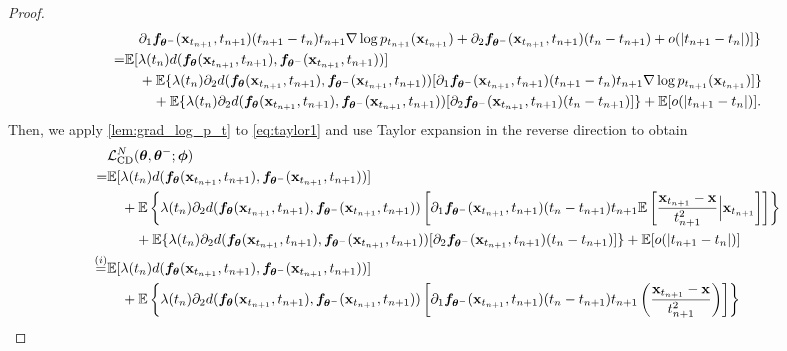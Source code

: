 \begin{appendices}
\begin{proof}
\begin{align}
    &\quad \partial_1{\bm{f}}_{{\bm{\theta}}^{-}}({\mathbf{x}}_{t_{n+1}}, t_{n+1})(t_{n+1} - t_n)t_{n+1} \nabla \log p_{t_{n+1}}({\mathbf{x}}_{t_{n+1}}) + \partial_2 {\bm{f}}_{{\bm{\theta}}^{-}}({\mathbf{x}}_{t_{n+1}}, t_{n+1}) (t_n-t_{n+1}) + o(|t_{n+1} - t_n|)]\}\notag \\
    =& \mathbb{E}[\lambda(t_n) d({\bm{f}}_{\bm{\theta}}({\mathbf{x}}_{t_{n+1}}, t_{n+1}),{\bm{f}}_{{\bm{\theta}}^{-}}({\mathbf{x}}_{t_{n+1}}, t_{n+1}))]\notag \\
    &\quad + \mathbb{E}\{\lambda(t_n) \partial_2 d({\bm{f}}_{\bm{\theta}}({\mathbf{x}}_{t_{n+1}}, t_{n+1}),{\bm{f}}_{{\bm{\theta}}^{-}}({\mathbf{x}}_{t_{n+1}}, t_{n+1}))[\partial_1{\bm{f}}_{{\bm{\theta}}^{-}}({\mathbf{x}}_{t_{n+1}}, t_{n+1})(t_{n+1} - t_n)t_{n+1} \nabla \log p_{t_{n+1}}({\mathbf{x}}_{t_{n+1}})]\}\notag \\
    &\qquad + \mathbb{E}\{\lambda(t_n) \partial_2 d({\bm{f}}_{\bm{\theta}}({\mathbf{x}}_{t_{n+1}}, t_{n+1}),{\bm{f}}_{{\bm{\theta}}^{-}}({\mathbf{x}}_{t_{n+1}}, t_{n+1}))[\partial_2 {\bm{f}}_{{\bm{\theta}}^{-}}({\mathbf{x}}_{t_{n+1}}, t_{n+1}) (t_n-t_{n+1})]\} + \mathbb{E}[o(|t_{n+1} - t_n|)]
    .\label{eq:taylor1}
\end{align}
Then, we apply \cref{lem:grad_log_p_t} to \cref{eq:taylor1} and use Taylor expansion in the reverse direction to obtain
\begin{align}
    &\mcal{L}_\text{CD}^N(\vtheta, \vtheta^{-}; \vphi)\notag \\
    =& \mbb{E}[\lambda(t_n) d(\vf_\vtheta(\rvx_{t_{n+1}}, t_{n+1}),\vf_{\vtheta^{-}}(\rvx_{t_{n+1}}, t_{n+1}))]\notag \\
    &\quad + \mbb{E}\left\{\lambda(t_n)\partial_2 d(\vf_\vtheta(\rvx_{t_{n+1}}, t_{n+1}),\vf_{\vtheta^{-}}(\rvx_{t_{n+1}}, t_{n+1}))\left[\partial_1\vf_{\vtheta^{-}}(\rvx_{t_{n+1}}, t_{n+1})(t_{n} - t_{n+1})t_{n+1} \mbb{E}\left[\frac{\rvx_{t_{n+1}} - \rvx}{t_{n+1}^2}\Big| \rvx_{t_{n+1}} \right]\right]\right \}\notag \\
    &\qquad + \mbb{E}\{\lambda(t_n)\partial_2 d(\vf_\vtheta(\rvx_{t_{n+1}}, t_{n+1}),\vf_{\vtheta^{-}}(\rvx_{t_{n+1}}, t_{n+1}))[\partial_2 \vf_{\vtheta^{-}}(\rvx_{t_{n+1}}, t_{n+1}) (t_n-t_{n+1})]\} + \mbb{E}[o(|t_{n+1} - t_n|)]\notag\\
    \stackrel{(i)}{=}& \mbb{E}[\lambda(t_n)d(\vf_\vtheta(\rvx_{t_{n+1}}, t_{n+1}),\vf_{\vtheta^{-}}(\rvx_{t_{n+1}}, t_{n+1}))]\notag \\
    &\quad + \mbb{E}\left\{\lambda(t_n)\partial_2 d(\vf_\vtheta(\rvx_{t_{n+1}}, t_{n+1}),\vf_{\vtheta^{-}}(\rvx_{t_{n+1}}, t_{n+1}))\left[\partial_1\vf_{\vtheta^{-}}(\rvx_{t_{n+1}}, t_{n+1})(t_{n} - t_{n+1})t_{n+1} \left(\frac{\rvx_{t_{n+1}} - \rvx}{t_{n+1}^2} \right)\right]\right \}\notag \\

\end{align}
\end{proof}
\end{appendices}
